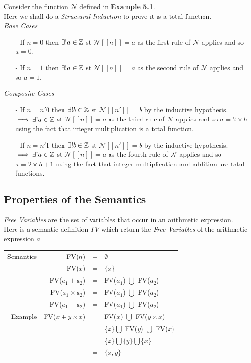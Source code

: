 \documentclass[11pt,a4paper]{article}
\begin{document}
Consider the function $\mathcal{N}$ defined in \textbf{Example 5.1}.\\ %
Here we shall do a \textit{Structural Induction} to prove it is a total function.\\
\textit{Base Cases}
\begin{itemize}
	\item[-] If $n=0$ then $\exists! a\in\mathbb{Z}$ st $\mathcal{N}[[n]]=a$ as the first rule of $\mathcal{N}$ applies and so $a=0$.
	\item[-] If $n=1$ then $\exists! a\in\mathbb{Z}$ st $\mathcal{N}[[n]]=a$ as the second rule of $\mathcal{N}$ applies and so $a=1$.
\end{itemize}
\textit{Composite Cases}
\begin{itemize}
	\item[-] If $n=n'0$ then $\exists!b\in\mathbb{Z}$ st $\mathcal{N}[[n']]=b$ by the inductive hypothesis.\\
	$\implies\exists!a\in\mathbb{Z}$ st $\mathcal{N}[[n]]=a$ as the third rule of $\mathcal{N}$ applies and so $a=2\times b$ using the fact that integer multiplication is a total function.
	\item[-] If $n=n'1$ then $\exists!b\in\mathbb{Z}$ st $\mathcal{N}[[n']]=b$ by the inductive hypothesis.\\
	$\implies\exists!a\in\mathbb{Z}$ st $\mathcal{N}[[n]]=a$ as the fourth rule of $\mathcal{N}$ applies and so $a=2\times b+1$ using the fact that integer multiplication and addition are total functions.
\end{itemize}

\subsection{Properties of the Semantics}

\textit{Free Variables} are the set of variables that occur in an arithmetic expression.\\
Here is a semantic definition $FV$ which return the \textit{Free Variables} of the arithmetic expression $a$
\begin{tabular}{rrcl}
Semantics&FV($n$)&=&$\emptyset$\\
&FV($x$)&=&$\{x\}$\\
&FV($a_1+a_2$)&=&FV($a_1$) $\bigcup$ FV($a_2$)\\
&FV($a_1\times a_2$)&=&FV($a_1$) $\bigcup$ FV($a_2$)\\
&FV($a_1-a_2$)&=&FV($a_1$) $\bigcup$ FV($a_2$)\\
Example&FV($x+y\times x$)&=&FV($x$) $\bigcup$ FV($y\times x$)\\
&&=&$\{x\}\bigcup$ FV($y$) $\bigcup$ FV($x$)\\
&&=&$\{x\}\bigcup \{y\}\bigcup \{x\}$\\
&&=&$\{x,y\}$
\end{tabular}
\end{document}
